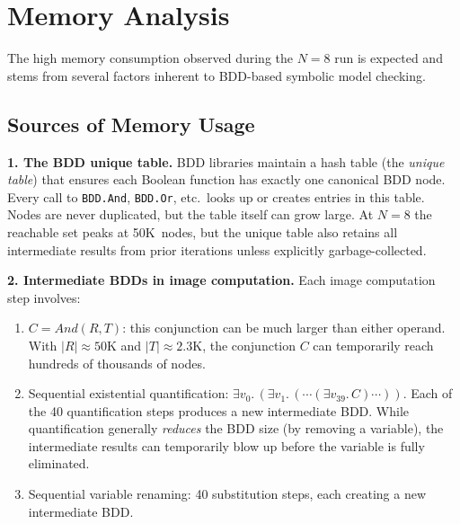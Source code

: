 \documentclass[11pt]{article}
\begin{document}
\section{Memory Analysis}
\label{sec:memory}

The high memory consumption observed during the $N=8$ run is expected
and stems from several factors inherent to BDD-based symbolic model
checking.

\subsection{Sources of Memory Usage}

\textbf{1. The BDD unique table.}
BDD libraries maintain a hash table (the \emph{unique table}) that
ensures each Boolean function has exactly one canonical BDD node.
Every call to \texttt{BDD.And}, \texttt{BDD.Or}, etc.\ looks up or
creates entries in this table.  Nodes are never duplicated, but the
table itself can grow large.  At $N=8$ the reachable set peaks at
50K~nodes, but the unique table also retains all intermediate results
from prior iterations unless explicitly garbage-collected.

\textbf{2. Intermediate BDDs in image computation.}
Each image computation step involves:
\begin{enumerate}
\item $C = \mathit{And}(R, T)$: this conjunction can be much larger
      than either operand.  With $|R| \approx 50\text{K}$ and
      $|T| \approx 2.3\text{K}$, the conjunction $C$ can temporarily
      reach hundreds of thousands of nodes.
\item Sequential existential quantification: $\exists v_0.\,(\exists v_1.\,
      (\cdots(\exists v_{39}.\, C)\cdots))$.  Each of the 40
      quantification steps produces a new intermediate BDD.  While
      quantification generally \emph{reduces} the BDD size (by
      removing a variable), the intermediate results can temporarily
      blow up before the variable is fully eliminated.
\item Sequential variable renaming: 40 substitution steps, each
      creating a new intermediate BDD.
\end{enumerate}
\end{document}
